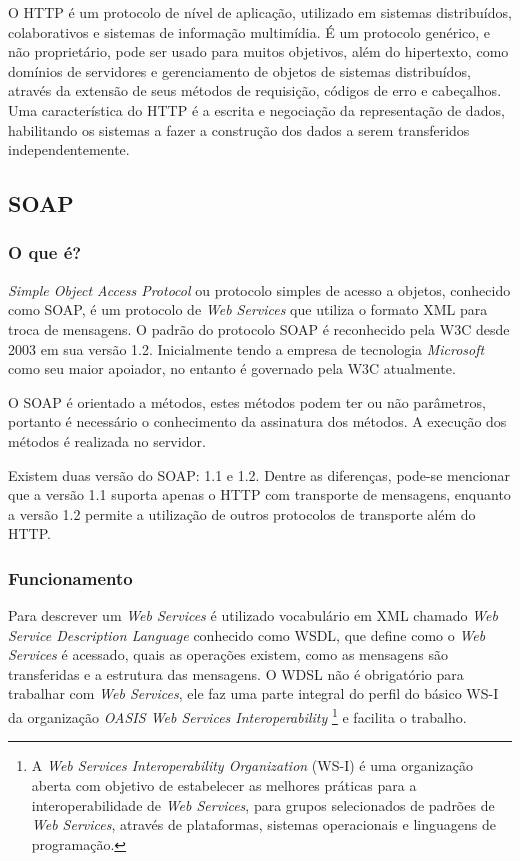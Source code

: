 \documentclass{acm_proc_article-sp}
\begin{document}
		O HTTP é um protocolo de nível de aplicação, utilizado em sistemas distribuídos, colaborativos e sistemas de informação multimídia. É um protocolo genérico, e não proprietário, pode ser usado para muitos objetivos, além do hipertexto, como domínios de servidores e gerenciamento de objetos de sistemas distribuídos, através da extensão de seus métodos de requisição, códigos de erro e cabeçalhos. Uma característica do HTTP é a escrita e negociação da representação de dados, habilitando os sistemas a fazer a construção dos dados a serem transferidos independentemente.\cite{HTTP-1.1}
	

		
		
		
	\subsection{SOAP}
	
		\subsubsection{O que é?}
	
			\emph{Simple Object Access Protocol} ou protocolo simples de acesso a objetos, conhecido como SOAP, é um protocolo de \emph{Web Services} que utiliza o formato XML para troca de mensagens. O padrão do protocolo SOAP é reconhecido pela W3C desde 2003 em sua versão 1.2. Inicialmente tendo a empresa de tecnologia \emph{Microsoft} como seu maior apoiador, no entanto é governado pela W3C atualmente.
		
			O SOAP é orientado a métodos, estes métodos podem ter ou não parâmetros, portanto é necessário o conhecimento da assinatura dos métodos. A execução dos métodos é realizada no servidor.
		
			Existem duas versão do SOAP: 1.1 e 1.2. Dentre as diferenças, pode-se mencionar que a versão 1.1 suporta apenas o HTTP com transporte de mensagens, enquanto a versão 1.2 permite a utilização de outros protocolos de transporte além do HTTP. \cite{WEBSERVICESZEND}
		
		\subsubsection{Funcionamento}
		
			Para descrever um \emph{Web Services} é utilizado vocabulário em XML chamado \emph{Web Service Description Language} conhecido como WSDL, que define como o \emph{Web Services} é acessado, quais as operações existem, como as mensagens são transferidas e a estrutura das mensagens. O WDSL não é obrigatório para trabalhar com \emph{Web Services}, ele faz uma parte integral do perfil do básico WS-I da organização \emph{OASIS Web Services Interoperability} \footnote{A \emph{Web Services Interoperability Organization} (WS-I) é uma organização aberta com objetivo de estabelecer as melhores práticas para a interoperabilidade de \emph{Web Services}, para grupos selecionados de padrões de \emph{Web Services}, através de plataformas, sistemas operacionais e linguagens de programação.\cite{OASIS-WS-I-SITE}} e facilita o trabalho. 
			
\end{document}
